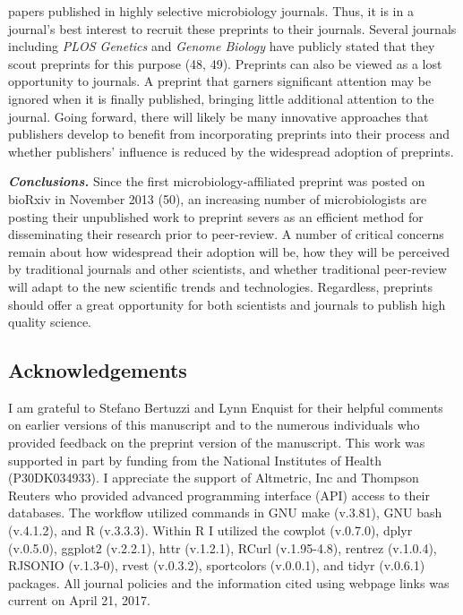 \documentclass[11,]{article}
\begin{document}
papers published in highly selective microbiology journals. Thus, it is
in a journal's best interest to recruit these preprints to their
journals. Several journals including \emph{PLOS Genetics} and
\emph{Genome Biology} have publicly stated that they scout preprints for
this purpose (48, 49). Preprints can also be viewed as a lost
opportunity to journals. A preprint that garners significant attention
may be ignored when it is finally published, bringing little additional
attention to the journal. Going forward, there will likely be many
innovative approaches that publishers develop to benefit from
incorporating preprints into their process and whether publishers'
influence is reduced by the widespread adoption of preprints.

\textbf{\emph{Conclusions.}} Since the first microbiology-affiliated
preprint was posted on bioRxiv in November 2013 (50), an increasing
number of microbiologists are posting their unpublished work to preprint
severs as an efficient method for disseminating their research prior to
peer-review. A number of critical concerns remain about how widespread
their adoption will be, how they will be perceived by traditional
journals and other scientists, and whether traditional peer-review will
adapt to the new scientific trends and technologies. Regardless,
preprints should offer a great opportunity for both scientists and
journals to publish high quality science.

\subsection{Acknowledgements}\label{acknowledgements}

I am grateful to Stefano Bertuzzi and Lynn Enquist for their helpful
comments on earlier versions of this manuscript and to the numerous
individuals who provided feedback on the preprint version of the
manuscript. This work was supported in part by funding from the National
Institutes of Health (P30DK034933). I appreciate the support of
Altmetric, Inc and Thompson Reuters who provided advanced programming
interface (API) access to their databases. The workflow utilized
commands in GNU make (v.3.81), GNU bash (v.4.1.2), and R (v.3.3.3).
Within R I utilized the cowplot (v.0.7.0), dplyr (v.0.5.0), ggplot2
(v.2.2.1), httr (v.1.2.1), RCurl (v.1.95-4.8), rentrez (v.1.0.4),
RJSONIO (v.1.3-0), rvest (v.0.3.2), sportcolors (v.0.0.1), and tidyr
(v.0.6.1) packages. All journal policies and the information cited using
webpage links was current on April 21, 2017.
\end{document}
